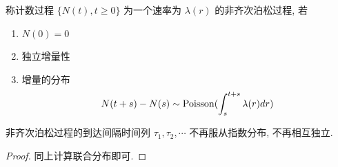 \begin{definition}
    称计数过程 $\{N(t),t\geq 0\}$ 为一个速率为 $\lambda(r)$ 的非齐次泊松过程, 若
    \begin{enumerate}
        \item $N(0)=0$
        \item 独立增量性
        \item 增量的分布
        \[
        N(t+s)-N(s)\sim \operatorname{Poisson}(\int_s^{t+s}\lambda(r)dr)
        \]
    \end{enumerate}
\end{definition}

\begin{proposition}
    非齐次泊松过程的到达间隔时间列 $\tau_1,\tau_2,\cdots$ 不再服从指数分布, 不再相互独立.
\end{proposition}
\begin{proof}
    同上计算联合分布即可.
\end{proof}
\newpage